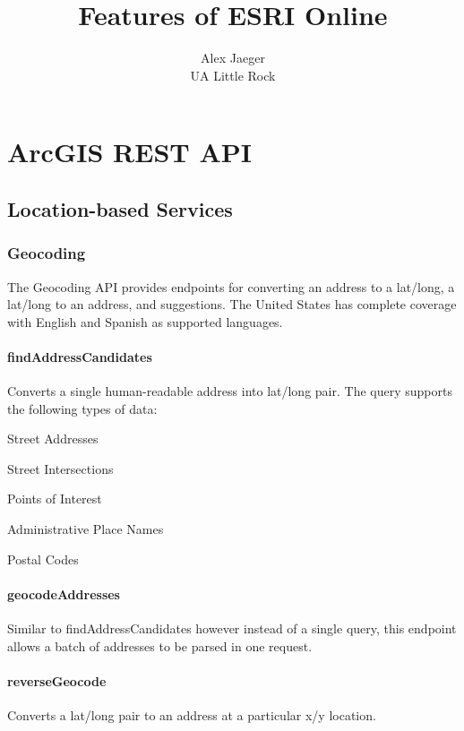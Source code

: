 \documentclass{vgtc}                          %
\title{Features of ESRI Online}
\author{
	Alex Jaeger \\ %
    \scriptsize UA Little Rock
}
\begin{document}
\maketitle

\tableofcontents

\section{ArcGIS REST API}

\subsection{Location-based Services}

\subsubsection{Geocoding}

The Geocoding API provides endpoints for converting an address to a lat/long, a lat/long to an address, and suggestions. The United States has complete coverage with English and Spanish as supported languages.

\paragraph{findAddressCandidates}
Converts a single human-readable address into lat/long pair. The query supports the following types of data:

\begin{enumerate*}
	\item Street Addresses
	\item Street Intersections
	\item Points of Interest
	\item Administrative Place Names
	\item Postal Codes
\end{enumerate*}	
	
	
\paragraph{geocodeAddresses}
Similar to findAddressCandidates however instead of a single query, this endpoint allows a batch of addresses to be parsed in one request.

\paragraph{reverseGeocode}
Converts a lat/long pair to an address at a particular x/y location.
\end{document}
